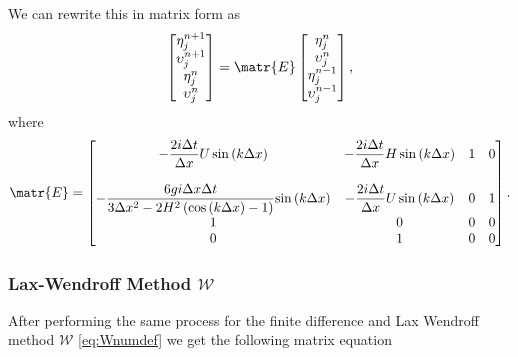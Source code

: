 We can rewrite this in matrix form as
\begin{equation}
\begin{bmatrix}
\eta^{n+1}_j \\
\upsilon^{n+1}_j\\
\eta^{n}_j \\
\upsilon^{n}_j
\end{bmatrix} = \matr{E}
\begin{bmatrix}
\eta^{n}_j \\
\upsilon^{n}_j\\
\eta^{n-1}_j \\
\upsilon^{n-1}_j
\end{bmatrix},
\end{equation}
where 
\begin{equation*}
\matr{E} = \begin{bmatrix}
-  \dfrac{2 i\Delta t }{\Delta x} U\sin\left(k \Delta x\right)  & -  \dfrac{2 i\Delta t}{\Delta x} H \sin\left(k \Delta x\right)  & 1 &0 \\ \\
-\dfrac{6 gi \Delta x\Delta t}{3 \Delta x^2 -2{H^2} \left( \cos\left(k \Delta x\right) - 1 \right)}{ \sin\left(k \Delta x\right)}  & -\dfrac{2i \Delta t }{\Delta x} U \sin\left(k \Delta x\right)  & 0 &1 \\
1  & 0  &0 &0 \\
0  & 1  &0 &0 
\end{bmatrix} .
\end{equation*}

\subsubsection{Lax-Wendroff Method $\mathcal{W}$ }
After performing the same process for the finite difference and Lax Wendroff method $\mathcal{W}$ \eqref{eq:Wnumdef} we get the following matrix equation

